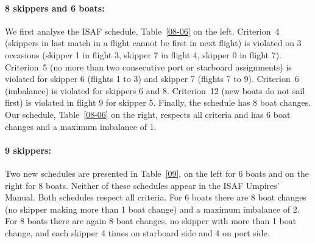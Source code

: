 \documentclass{llncs}
\begin{document}
\paragraph{8 skippers and 6 boats:} We first analyse the ISAF schedule, Table~\ref{08-06} on the
left. Criterion~4 (skippers in last match in a flight cannot be first in next flight) is violated on
3 occasions (skipper 1 in flight 3, skipper 7 in flight 4, skipper 0 in flight 7). Criterion~5 (no
more than two consecutive port or starboard assignments) is violated for skipper 6 (flights 1 to 3)
and skipper 7 (flights 7 to 9). Criterion~6 (imbalance) is violated for skippers 6 and 8. Criterion~12  (new
boats do not sail first) is violated in flight 9 for skipper 5. Finally, the schedule has 8 boat
changes. Our schedule, Table~\ref{08-06} on the right, respects all criteria and has 6 boat changes
and a maximum imbalance of 1.

\paragraph{9 skippers:} Two new schedules are presented in Table~\ref{09}, on the left for 6 boats
and on the right for 8 boats. Neither of these schedules appear in the ISAF Umpires' Manual. Both
schedules respect all criteria. For 6 boats there are 8 boat changes (no skipper making more than 1
boat change) and a maximum imbalance of 2. For 8 boats there are again 8 boat changes, no skipper
with more than 1 boat change, and each skipper 4 times on starboard side and 4 on port side.
\end{document}
